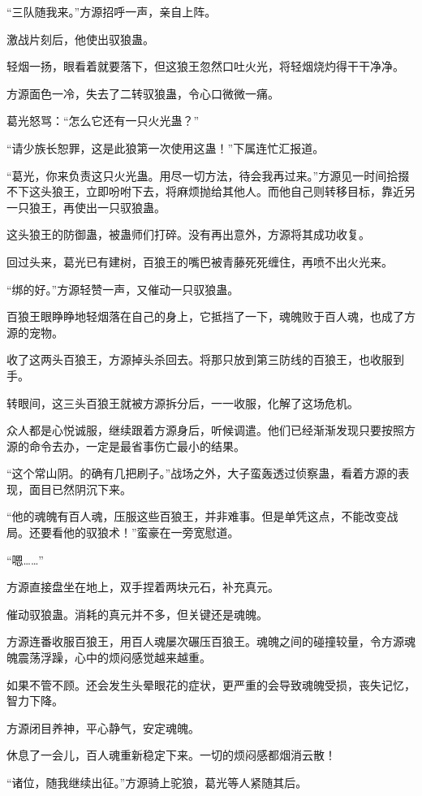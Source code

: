 \begin{this_body}
“三队随我来。”方源招呼一声，亲自上阵。

激战片刻后，他使出驭狼蛊。

轻烟一扬，眼看着就要落下，但这狼王忽然口吐火光，将轻烟烧灼得干干净净。

方源面色一冷，失去了二转驭狼蛊，令心口微微一痛。

葛光怒骂：“怎么它还有一只火光蛊？”

“请少族长恕罪，这是此狼第一次使用这蛊！”下属连忙汇报道。

“葛光，你来负责这只火光蛊。用尽一切方法，待会我再过来。”方源见一时间拾掇不下这头狼王，立即吩咐下去，将麻烦抛给其他人。而他自己则转移目标，靠近另一只狼王，再使出一只驭狼蛊。

这头狼王的防御蛊，被蛊师们打碎。没有再出意外，方源将其成功收复。

回过头来，葛光已有建树，百狼王的嘴巴被青藤死死缠住，再喷不出火光来。

“绑的好。”方源轻赞一声，又催动一只驭狼蛊。

百狼王眼睁睁地轻烟落在自己的身上，它抵挡了一下，魂魄败于百人魂，也成了方源的宠物。

收了这两头百狼王，方源掉头杀回去。将那只放到第三防线的百狼王，也收服到手。

转眼间，这三头百狼王就被方源拆分后，一一收服，化解了这场危机。

众人都是心悦诚服，继续跟着方源身后，听候调遣。他们已经渐渐发现只要按照方源的命令去办，一定是最省事伤亡最小的结果。

“这个常山阴。的确有几把刷子。”战场之外，大子蛮轰透过侦察蛊，看着方源的表现，面目已然阴沉下来。

“他的魂魄有百人魂，压服这些百狼王，并非难事。但是单凭这点，不能改变战局。还要看他的驭狼术！”蛮豪在一旁宽慰道。

“嗯……”

方源直接盘坐在地上，双手捏着两块元石，补充真元。

催动驭狼蛊。消耗的真元并不多，但关键还是魂魄。

方源连番收服百狼王，用百人魂屡次碾压百狼王。魂魄之间的碰撞较量，令方源魂魄震荡浮躁，心中的烦闷感觉越来越重。

如果不管不顾。还会发生头晕眼花的症状，更严重的会导致魂魄受损，丧失记忆，智力下降。

方源闭目养神，平心静气，安定魂魄。

休息了一会儿，百人魂重新稳定下来。一切的烦闷感都烟消云散！

“诸位，随我继续出征。”方源骑上驼狼，葛光等人紧随其后。


\end{this_body}
